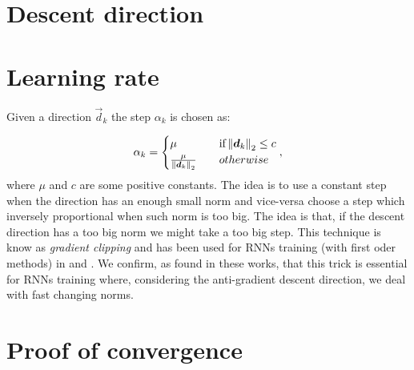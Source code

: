 \section{Descent direction}

\section{Learning rate}

Given a direction $\vec{d}_k$ the step $\alpha_k$ is chosen as:

\begin{equation}
\alpha_k = 
\begin{cases}
	\mu \quad &\mbox{if} \left\Vert \boldsymbol{d}_k \right\Vert_2 \leq c\\
	\frac{\mu}{\left\Vert \boldsymbol{d}_k \right\Vert_2} \quad & otherwise
\end{cases},
\end{equation}
where $\mu$ and $c$ are some positive constants. The idea is to use a constant step when the direction has an enough small norm and vice-versa choose a step which inversely proportional when such norm is too big. The idea is that, if the descent direction has a too big norm we might take a too big step. This technique is know as \textit{gradient clipping} and has been used for RNNs training (with first oder methods) in \cite{pascanu} and \cite{mikolov}. We confirm, as found in these works, that this trick is essential for RNNs training where, considering the anti-gradient descent direction, we deal with fast changing norms.
\section{Proof of convergence}

